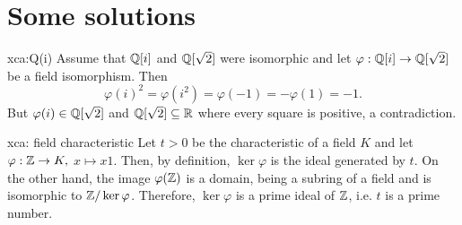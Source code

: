 \section*{Some solutions}

\fancyhf{}
\fancyfoot[R]{\thepage}
\fancyhead[L]{\course}
\setlength{\headheight}{14pt}

\newtheorem{lemma*}{Lemma}




\begin{sol}{xca:Q(i)}
Assume that $\mathbb{Q}[i]$ and $\mathbb{Q}[\sqrt{2}]$ were isomorphic 
and let $\varphi:\mathbb{Q}[i]\to \mathbb{Q}[\sqrt{2}]$
be a field isomorphism.
Then 
    \[
    \varphi(i)^2=
    \varphi(i^2)=
    \varphi(-1)=
    -\varphi(1)=-1.
    \]
But $\varphi(i)\in\mathbb{Q}[\sqrt{2}]$ and
$\mathbb{Q}[\sqrt{2}]\subseteq \mathbb{R}$ where every square is 
positive, a contradiction.
\end{sol}

\begin{sol}{xca: field characteristic}
    Let $t>0$ be the characteristic of a field $K$ and 
    let $\varphi:\mathbb{Z}\to K,$ $x\mapsto x1$.
    Then, by definition, $\ker\varphi$ is 
    the ideal generated by $t$.
    On the other hand, the image $\varphi(\mathbb{Z})$ is 
    a domain, being a subring of a field
    and is isomorphic to $\mathbb{Z}/\ker\varphi$.
    Therefore, $\ker\varphi$ is a prime ideal of $\mathbb{Z}$,
    i.e. $t$ is a prime number.
\end{sol}


